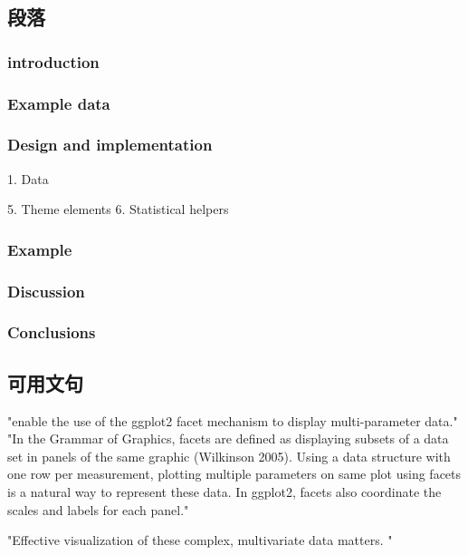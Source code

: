 \documentclass[article]{jss}
\begin{document}
\subsection{段落}
\subsubsection{introduction}
\subsubsection{Example data}
\subsubsection{Design and implementation}
1. Data



5. Theme elements
6. Statistical helpers %
\subsubsection{Example}
\subsubsection{Discussion}
\subsubsection{Conclusions}

\subsection{可用文句}
"enable the use of the ggplot2 facet mechanism to display multi-parameter
data."
"In the Grammar of Graphics, facets are defined as displaying subsets of a data set in panels
of the same graphic (Wilkinson 2005). Using a data structure with one row per measurement,
plotting multiple parameters on same plot using facets is a natural way to represent these
data. In ggplot2, facets also coordinate the scales and labels for each panel."



"Effective visualization of these complex, multivariate data matters. "
\end{document}
